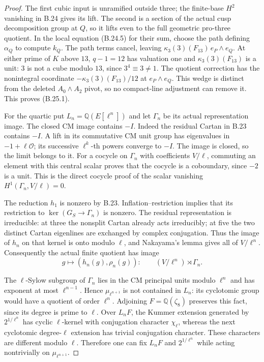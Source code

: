 \begin{proof}
The first cubic input is unramified outside three;
the finite-base $H^2$ vanishing in B.24 gives its lift.
The second is a section of the actual cusp decomposition
group at $Q$, so it lifts even to the full geometric
pro-three quotient. In the local equation (B.24.5) for
their sum, choose the path defining $\alpha_Q$ to compute
$k_Q$. The path terms cancel, leaving
$\kappa_3(3)(F_{13})\,e_P\wedge e_Q$.
At either prime of $K$ above $13$, $q-1=12$ has valuation
one and $\kappa_3(3)(F_{13})$ is a unit: $3$ is not a
cube modulo $13$, since $3^4\equiv3\ne1$.
The quotient correction has the nonintegral coordinate
$-\kappa_3(3)(F_{13})/12$ at $e_P\wedge e_Q$.
This wedge is distinct from the deleted
$A_0\wedge A_2$ pivot, so no compact-line adjustment
can remove it. This proves (B.25.1).

For the quartic put $L_n=\mathbb Q(E[\ell^n])$ and
let $\Gamma_n$ be its actual representation image.
The closed CM image contains $-I$.
Indeed the residual Cartan in B.23 contains $-I$.
A lift in its commutative CM unit group has eigenvalues
in $-1+\ell\mathcal O$; its successive
$\ell^k$-th powers converge to $-I$.
The image is closed, so the limit belongs to it.
For a cocycle on $\Gamma_n$ with coefficients $V/\ell$,
commuting an element with this central scalar proves
that the cocycle is a coboundary, since $-2$ is a unit.
This is the direct cocycle proof of the scalar
vanishing $H^1(\Gamma_n,V/\ell)=0$.

The reduction $h_1$ is nonzero by B.23.
Inflation--restriction implies that its restriction
to $\ker(G_S\to\Gamma_n)$ is nonzero.
The residual representation is irreducible:
at three the nonsplit Cartan already acts irreducibly;
at five the two distinct Cartan eigenlines are
exchanged by complex conjugation.
Thus the image of $h_n$ on that kernel is onto modulo
$\ell$, and Nakayama's lemma gives all of $V/\ell^n$.
Consequently the actual finite quotient has image
\[
 g\longmapsto(h_n(g),\rho_n(g)):
 \qquad (V/\ell^n)\rtimes\Gamma_n .
                                                               \tag{B.25.4}
\]

The $\ell$-Sylow subgroup of $\Gamma_n$ lies in the
CM principal units modulo $\ell^n$ and has exponent
at most $\ell^{n-1}$. Hence $\mu_{\ell^{n+1}}$ is
not contained in $L_n$: its cyclotomic group would
have a quotient of order $\ell^n$.
Adjoining $F=\mathbb Q(\zeta_8)$ preserves this fact,
since its degree is prime to $\ell$.
Over $L_nF$, the Kummer extension generated by
$2^{1/\ell^n}$ has cyclic $\ell$-kernel with
conjugation character $\chi_\ell$, whereas the
next cyclotomic degree-$\ell$ extension has trivial
conjugation character. These characters are
different modulo $\ell$. Therefore one can fix
$L_nF$ and $2^{1/\ell^n}$ while acting nontrivially
on $\mu_{\ell^{n+1}}$.


\end{proof}
